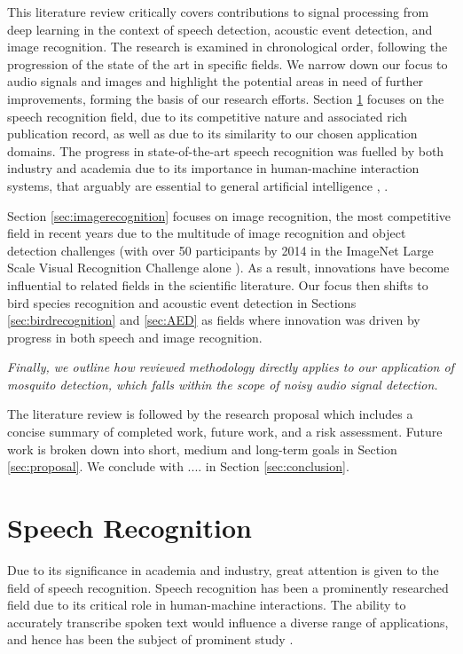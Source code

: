 \documentclass[12pt]{llncs}
\newcommand{\ikn}[1]{\todo[size = \small, color=orange!30]{[ik] #1}}
\begin{document}
This literature review critically covers contributions to signal processing from deep learning in the context of speech detection, acoustic event detection, and image recognition. The research is examined in chronological order, following the progression of the state of the art in specific fields. We narrow down our focus to audio signals and images and highlight the potential areas in need of further improvements\ikn{Need to do this}, forming the basis of our research efforts. Section \ref{sec:speechrecognition} focuses on the speech recognition field, due to its competitive nature and associated rich publication record, as well as due to its similarity to our chosen application domains.\ikn{Which are?} The progress in state-of-the-art speech recognition was fuelled by both industry and academia due to its importance in human-machine interaction systems, that arguably are essential to general artificial intelligence \cite{rabiner1993fundamentals}, \cite{juang2005automatic}.

Section \ref{sec:imagerecognition} focuses on image recognition, the most competitive field in recent years due to the multitude of image recognition and object detection challenges (with over 50 participants by 2014 in the ImageNet Large Scale Visual Recognition Challenge alone \cite{russakovsky2014imagenet}). As a result, innovations have become influential to related fields in the scientific literature.
Our focus then shifts to bird species recognition and acoustic event detection in Sections \ref{sec:birdrecognition} and \ref{sec:AED} as fields where innovation was driven by progress in both speech and image recognition.


\emph{Finally, we outline how reviewed methodology directly applies to our application of mosquito detection, which falls within the scope of noisy audio signal detection.} \ikn{To do}

The literature review is followed by the research proposal which includes a concise summary of completed work, future work, and a risk assessment. Future work is broken down into short, medium and long-term goals in Section \ref{sec:proposal}. We conclude with .... in Section \ref{sec:conclusion}.



\section{Speech Recognition}
\label{sec:speechrecognition}
Due to its significance in academia and industry, great attention is given to the field of speech recognition. Speech recognition has been a prominently researched field due to its critical role in human-machine interactions. The ability to accurately transcribe spoken text would influence a diverse range of applications, and hence has been the subject of prominent study \cite{juang2005automatic}. 
\end{document}
